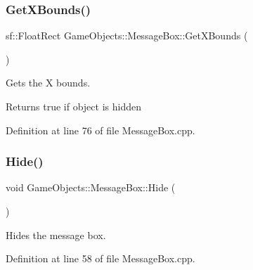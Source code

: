 \subsubsection{\texorpdfstring{GetXBounds()}{GetXBounds()}}
{\footnotesize\ttfamily sf\+::\+Float\+Rect Game\+Objects\+::\+Message\+Box\+::\+Get\+X\+Bounds (\begin{DoxyParamCaption}{ }\end{DoxyParamCaption})}



Gets the X bounds. 

\begin{DoxyReturn}{Returns}
true if object is hidden \begin{DoxyVerb}\end{DoxyVerb}
 
\end{DoxyReturn}


Definition at line 76 of file Message\+Box.\+cpp.


\begin{DoxyCode}{0}

\end{DoxyCode}
\mbox{\label{class_game_objects_1_1_message_box_abda08bef1372287caa376336ec62ee25}} 
\subsubsection{\texorpdfstring{Hide()}{Hide()}}
{\footnotesize\ttfamily void Game\+Objects\+::\+Message\+Box\+::\+Hide (\begin{DoxyParamCaption}{ }\end{DoxyParamCaption})}



Hides the message box. 

\begin{DoxyVerb}\end{DoxyVerb}
 

Definition at line 58 of file Message\+Box.\+cpp.


\begin{DoxyCode}{0}

\end{DoxyCode}
\mbox{\label{class_game_objects_1_1_message_box_a307b6074130607c6b1fff696315e8dc9}} 
